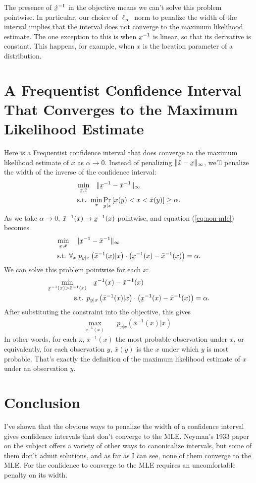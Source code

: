 \documentclass{article}
\newcommand{\xl}{\underaccent{\bar}{x}}
\newcommand{\xh}{\bar{x}}
\newcommand{\xli}{\xl^{-1}}
\newcommand{\xhi}{\xh^{-1}}
\newcommand{\1}{\mathbf{1}}
\begin{document}
The presence of $\dot{\xl}^{-1}$ in the objective means we can't solve this
problem pointwise. In particular, our choice of $\ell_\infty$ norm to penalize
the width of the interval implies that the interval does not converge to the
maximum likelihood estimate. The one exception to this is when $\xli$ is
linear, so that its derivative is constant. This happens, for example, when $x$
is the location parameter of a distribution.

\section{A Frequentist Confidence Interval That Converges to the Maximum Likelihood Estimate}

Here is a Frequentist confidence interval that does converge to the maximum
likelihood estimate of $x$ as $\alpha\to 0$. Instead of penalizing
$\|\xh-\xl\|_\infty$, we'll penalize the width of the inverse of the confidence
interval:
\begin{align}
\min_{\xl, \xh} &\quad  \| \xl^{-1} - \xh^{-1} \|_\infty \\
\text{s.t. } & \min_x \Pr_{y|x}\left[\xl(y) < x < \xh(y) \right] \geq \alpha.
\end{align}
As we take $\alpha\to 0$, $\xh^{-1}(x) \to \xl^{-1}(x)$ pointwise, and equation (\ref{eq:non-mle}) becomes
\begin{align}
  \min_{\xl, \xh} &\quad  \| \xl^{-1} - \xh^{-1} \|_\infty \\
  \text{s.t. } & \forall_x\; p_{y|x}\left(\xh^{-1}(x) | x\right) \cdot \left(\xl^{-1}(x)-\xh^{-1}(x)\right) = \alpha.
\end{align}
We can solve this problem pointwise for each $x$:
\begin{align}
  \min_{\xli(x)> \xhi(x)} &\quad  \xli(x) - \xhi(x) \\
  \text{s.t. } &  p_{y|x}\left(\xhi(x) | x\right) \cdot \left(\xli(x)-\xhi(x)\right) = \alpha.
\end{align}
After substituting the constraint into the objective, this gives
\begin{align}
  \max_{\xhi(x)} &\quad  p_{y|x}\left(\xhi(x) | x\right) 
\end{align}
In other words, for each x, $\xhi(x)$ the most probable observation under
$x$, or equivalently, for each observation $y$, $\xh(y)$ is the $x$ under which
$y$ is most probable. That's exactly the definition of the maximum likelihood
estimate of $x$ under an observation $y$.
 
\section{Conclusion}

I've shown that the obvious ways to penalize the width of a confidence interval
gives confidence intervals that don't converge to the MLE. Neyman's 1933 paper
on the subject offers a variety of other ways to canonicalize intervals, but
some of them don't admit solutions, and as far as I can see, none of them
converge to the MLE. For the confidence to converge to the MLE requires an
uncomfortable penalty on its width.
\end{document}
